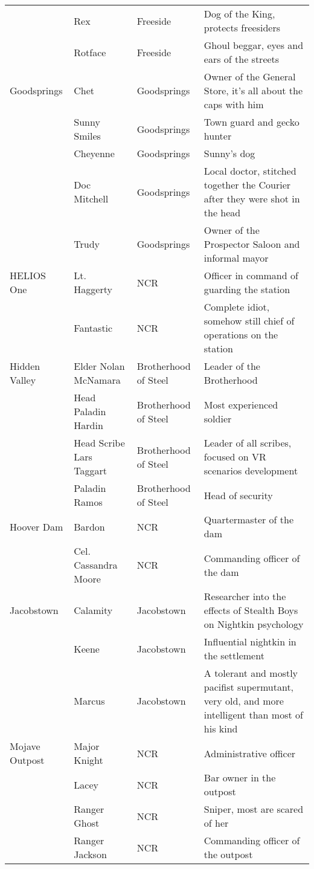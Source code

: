 \begin{longtable}{|p{3cm}|p{3cm}|p{3cm}|p{6cm}|}
\hfill & Rex & Freeside & Dog of the King, protects freesiders \\
\hfill & Rotface & Freeside & Ghoul beggar, eyes and ears of the streets \\
Goodsprings & Chet & Goodsprings & Owner of the General Store, it's all about the caps with him \\
\hfill & Sunny Smiles & Goodsprings & Town guard and gecko hunter \\
\hfill & Cheyenne & Goodsprings & Sunny's dog \\
\hfill & Doc Mitchell & Goodsprings & Local doctor, stitched together the Courier after they were shot in the head \\
\hfill & Trudy & Goodsprings & Owner of the Prospector Saloon and informal mayor \\
HELIOS One & Lt. Haggerty & NCR & Officer in command of guarding the station \\
\hfill & Fantastic & NCR & Complete idiot, somehow still chief of operations on the station \\
Hidden Valley & Elder Nolan McNamara & Brotherhood of Steel & Leader of the Brotherhood \\
\hfill & Head Paladin Hardin & Brotherhood of Steel & Most experienced soldier \\
\hfill & Head Scribe Lars Taggart & Brotherhood of Steel & Leader of all scribes, focused on VR scenarios development \\
\hfill & Paladin Ramos & Brotherhood of Steel & Head of security \\
Hoover Dam & Bardon & NCR & Quartermaster of the dam \\
\hfill & Cel. Cassandra Moore & NCR & Commanding officer of the dam \\
Jacobstown & Calamity & Jacobstown & Researcher into the effects of Stealth Boys on Nightkin psychology \\
\hfill & Keene & Jacobstown & Influential nightkin in the settlement \\
\hfill & Marcus & Jacobstown & A tolerant and mostly pacifist supermutant, very old, and more intelligent than most of his kind \\
Mojave Outpost & Major Knight & NCR & Administrative officer \\
\hfill & Lacey & NCR & Bar owner in the outpost \\
\hfill & Ranger Ghost & NCR & Sniper, most are scared of her \\
\hfill & Ranger Jackson & NCR & Commanding officer of the outpost \\

\end{longtable}
